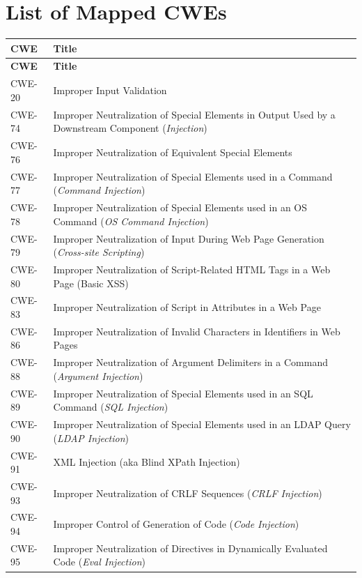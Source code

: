 \documentclass[11pt]{article}
\begin{document}
\section{List of Mapped CWEs}
\renewcommand{\arraystretch}{1.1}
\begin{longtable}{@{}p{2.4cm}p{12.0cm}@{}}
\toprule
\textbf{CWE} & \textbf{Title} \\
\midrule
\endfirsthead
\toprule
\textbf{CWE} & \textbf{Title} \\
\midrule
\endhead
\bottomrule
\endfoot

CWE-20  & Improper Input Validation \\
CWE-74  & Improper Neutralization of Special Elements in Output Used by a Downstream Component (\textit{Injection}) \\
CWE-76  & Improper Neutralization of Equivalent Special Elements \\
CWE-77  & Improper Neutralization of Special Elements used in a Command (\textit{Command Injection}) \\
CWE-78  & Improper Neutralization of Special Elements used in an OS Command (\textit{OS Command Injection}) \\
CWE-79  & Improper Neutralization of Input During Web Page Generation (\textit{Cross-site Scripting}) \\
CWE-80  & Improper Neutralization of Script-Related HTML Tags in a Web Page (Basic XSS) \\
CWE-83  & Improper Neutralization of Script in Attributes in a Web Page \\
CWE-86  & Improper Neutralization of Invalid Characters in Identifiers in Web Pages \\
CWE-88  & Improper Neutralization of Argument Delimiters in a Command (\textit{Argument Injection}) \\
CWE-89  & Improper Neutralization of Special Elements used in an SQL Command (\textit{SQL Injection}) \\
CWE-90  & Improper Neutralization of Special Elements used in an LDAP Query (\textit{LDAP Injection}) \\
CWE-91  & XML Injection (aka Blind XPath Injection) \\
CWE-93  & Improper Neutralization of CRLF Sequences (\textit{CRLF Injection}) \\
CWE-94  & Improper Control of Generation of Code (\textit{Code Injection}) \\
CWE-95  & Improper Neutralization of Directives in Dynamically Evaluated Code (\textit{Eval Injection}) \\

\end{longtable}
\end{document}
